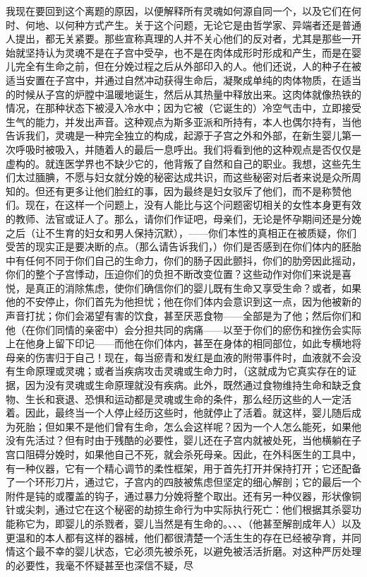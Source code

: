 我现在要回到这个离题的原因，以便解释所有灵魂如何源自同一个，以及它们在何时、何地、以何种方式产生。关于这个问题，无论它是由哲学家、异端者还是普通人提出，都无关紧要。那些宣称真理的人并不关心他们的反对者，尤其是那些一开始就坚持认为灵魂不是在子宫中受孕，也不是在肉体成形时形成和产生，而是在婴儿完全有生命之前，但在分娩过程之后从外部印入的人。他们还说，人的种子在被适当安置在子宫中，并通过自然冲动获得生命后，凝聚成单纯的肉体物质，在适当的时候从子宫的炉膛中温暖地诞生，然后从其热量中释放出来。这肉体就像热铁的情况，在那种状态下被浸入冷水中；因为它被（它诞生的）冷空气击中，立即接受生气的能力，并发出声音。这种观点为斯多亚派和所持有，本人也偶尔持有，当他告诉我们，灵魂是一种完全独立的构成，起源于子宫之外和外部，在新生婴儿第一次呼吸时被吸入，并随着人的最后一息呼出。我们将看到他的这种观点是否仅仅是虚构的。就连医学界也不缺少它的，他背叛了自然和自己的职业。我想，这些先生们太过腼腆，不愿与妇女就分娩的秘密达成共识，而这些秘密对后者来说是众所周知的。但还有更多让他们脸红的事，因为最终是妇女驳斥了他们，而不是称赞他们。现在，在这样一个问题上，没有人能比与这个问题密切相关的女性本身更有效的教师、法官或证人了。那么，请你们作证吧，母亲们，无论是怀孕期间还是分娩之后（让不生育的妇女和男人保持沉默），——你们本性的真相正在被质疑，你们受苦的现实正是要决断的点。（那么请告诉我们，）你们是否感到在你们体内的胚胎中有任何不同于你们自己的生命力，你们的肠子因此颤抖，你们的肋旁因此摇动，你们的整个子宫悸动，压迫你们的负担不断改变位置？这些动作对你们来说是喜悦，是真正的消除焦虑，使你们确信你们的婴儿既有生命又享受生命？或者，如果他的不安停止，你们首先为他担忧；他在你们体内会意识到这一点，因为他被新的声音打扰；你们会渴望有害的饮食，甚至厌恶食物——全部是为了他；然后你们和他（在你们同情的亲密中）会分担共同的病痛——以至于你们的瘀伤和挫伤会实际上在他身上留下印记——而他在你们体内，甚至在身体的相同部位，如此专横地将母亲的伤害归于自己！现在，每当瘀青和发红是血液的附带事件时，血液就不会没有生命原理或灵魂；或者当疾病攻击灵魂或生命力时，（这就成为它真实存在的证据，因为没有灵魂或生命原理就没有疾病。此外，既然通过食物维持生命和缺乏食物、生长和衰退、恐惧和运动都是灵魂或生命的条件，那么经历这些的人一定活着。因此，最终当一个人停止经历这些时，他就停止了活着。就这样，婴儿随后成为死胎；但如果不是他们曾有生命，怎么会这样呢？因为一个人怎么能死，如果他没有先活过？但有时由于残酷的必要性，婴儿还在子宫内就被处死，当他横躺在子宫口阻碍分娩时，如果他自己不死，就会杀死母亲。因此，在外科医生的工具中，有一种仪器，它有一个精心调节的柔性框架，用于首先打开并保持打开；它还配备了一个环形刀片，通过它，子宫内的四肢被焦虑但坚定的细心解剖；它的最后一个附件是钝的或覆盖的钩子，通过暴力分娩将整个取出。还有另一种仪器，形状像铜针或尖刺，通过它在这个秘密的劫掠生命行为中实际执行死亡：他们根据其杀婴功能称它为，即婴儿的杀戮者，婴儿当然是有生命的。、、、（他甚至解剖成年人）以及更温和的本人都有这样的器械，他们都很清楚一个活生生的存在已经被孕育，并同情这个最不幸的婴儿状态，它必须先被杀死，以避免被活活折磨。对这种严厉处理的必要性，我毫不怀疑甚至也深信不疑，尽